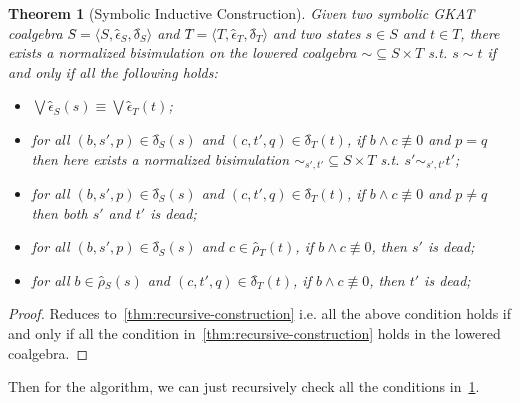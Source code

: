 \documentclass[conference]{IEEEtran}
\newtheorem{theorem}{Theorem}
\begin{document}
\begin{theorem}[Symbolic Inductive Construction]\label{thm:symb-recursive-construction}
    Given two symbolic GKAT coalgebra \(Ŝ = ⟨S, ϵ̂_S, δ̂_S⟩\) and \(T̂ = ⟨T, ϵ̂_T, δ̂_T⟩\) and two states \(s ∈ S\) and \(t ∈ T\), there exists a normalized bisimulation on the lowered coalgebra \({∼} ⊆ S × T\) s.t. \(s ∼ t\) if and only if all the following holds:
    \begin{itemize}
        \item \(⋁ ϵ̂_S(s) ≡ ⋁ ϵ̂_T(t)\);
        \item for all \((b, s', p) ∈ δ̂_S(s)\) and \((c, t', q) ∈ δ̂_T(t)\), if \(b ∧ c ≢ 0\) and \(p = q\) then here exists a normalized bisimulation \({∼_{s',t'}} ⊆ S × T\) s.t. \(s' ∼_{s',t'} t'\);
        \item for all \((b, s', p) ∈ δ̂_S(s)\) and \((c, t', q) ∈ δ̂_T(t)\), if \(b ∧ c ≢ 0\) and \(p ≠ q\) then both \(s'\) and \(t'\) is dead;  
        \item for all \((b, s', p) ∈ δ̂_S(s)\) and \(c ∈ ρ̂_T(t)\), if \(b ∧ c ≢ 0\), then \(s'\) is dead;
        \item for all \(b ∈ ρ̂_S(s)\) and \((c, t', q) ∈ δ̂_T(t)\), if \(b ∧ c ≢ 0\), then \(t'\) is dead;
    \end{itemize}
\end{theorem}

\begin{proof}
    Reduces to~\cref{thm:recursive-construction} i.e. all the above condition holds if and only if all the condition in~\cref{thm:recursive-construction} holds in the lowered coalgebra.
\end{proof}

Then for the algorithm, we can just recursively check all the conditions in~\cref{thm:symb-recursive-construction}.
\end{document}
